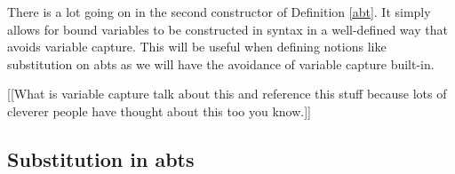 \begin{remark}
    There is a lot going on in the second constructor of Definition \ref{abt}. It simply allows for bound variables to be constructed in syntax in a well-defined way that avoids variable capture. This will be useful when defining notions like substitution on abts as we will have the avoidance of variable capture built-in.
\end{remark}

[[What is variable capture talk about this and reference this stuff because lots of cleverer people have thought about this too you know.]]
\subsection{Substitution in abts}

